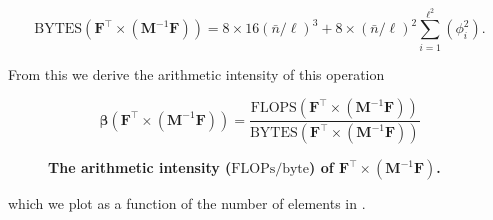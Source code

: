 \begin{equation}
	\text{BYTES}(\textbf{F}^{\intercal} \times (\textbf{M}^{-1}\textbf{F})) = 8 \times 16 (\bar{n}/\ell)^3 + 8 \times (\bar{n}/\ell)^2 \sum_{i=1}^{\ell^2} (\phi_i^2).
	\label{eqn:bytes_fmf}
\end{equation}

\noindent 
From this we derive the arithmetic intensity of this operation  

\begin{equation}
	\symbf{\beta}(\textbf{F}^{\intercal} \times (\textbf{M}^{-1}\textbf{F})) = \frac{\text{FLOPS}(\textbf{F}^{\intercal} \times (\textbf{M}^{-1}\textbf{F}))}{\text{BYTES}(\textbf{F}^{\intercal} \times (\textbf{M}^{-1}\textbf{F}))}
\end{equation}

%
%
%
\begin{figure}[!ht]
	{\centering 
	}
	\caption{\textbf{The arithmetic intensity ($\text{FLOPs}/\text{byte}$) of $\textbf{F}^\intercal \times (\textbf{M}^{-1} \textbf{F})$.}}
	\label{fig:ftmt_ai}
\end{figure}

\noindent
which we plot as a function of the number of elements in .



%		

